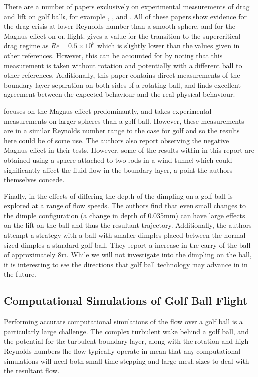 There are a number of papers exclusively on experimental measurements of drag and lift on golf balls, 
for example \citet{Kharlamov2007Magnus}, \citet{Naruo2014}, \citet{Kray2012} and \citet{Aoki2010}.
All of these papers show evidence for the drag crisis at lower Reynolds number than a smooth sphere,
and for the Magnus effect on on flight. \citet{Aoki2010} gives a value for the transition to the
supercritical drag regime as $Re = 0.5\times10^5$ which is slightly lower than the values given in
other references. However, this can be accounted for by noting that this measurement is taken without
rotation and potentially with a different ball to other references. Additionally, this paper contains
direct measurements of the boundary layer separation on both sides of a rotating ball, and finds 
excellent agreement between the expected behaviour and the real physical behaviour.

\citet{Kray2012} focuses on the Magnus effect predominantly, and takes experimental measurements on
larger spheres than a golf ball. However, these measurements are in a similar Reynolds number range
to the case for golf and so the results here could be of some use. The authors also report observing
the negative Magnus effect in their tests. However, some of the results within in this report are
obtained using a sphere attached to two rods in a wind tunnel which could significantly affect the fluid flow
in the boundary layer, a point the authors themselves concede.

Finally, in \citet{Naruo2014} the effects of differing the depth of the dimpling on a golf ball is 
explored at a range of flow speeds. The authors find that even small changes to the dimple configuration 
(a change in depth of 0.035mm)
can have large effects on the lift on the ball and thus the resultant trajectory. Additionally, the
authors attempt a strategy with a ball with smaller dimples placed between the normal sized dimples
a standard golf ball. They report a increase in the carry of the ball of approximately 8m. While we will not 
investigate into the dimpling on the ball, it is interesting to see the directions that golf ball
technology may advance in in the future.

\subsection{Computational Simulations of Golf Ball Flight}

Performing accurate computational simulations of the flow over a golf ball is a particularly large 
challenge. The complex turbulent wake behind a golf ball, and the potential for the turbulent boundary
layer, along with the rotation and high Reynolds numbers the flow typically operate in mean that any
computational simulations will need both small time stepping and large mesh sizes to deal with the 
resultant flow.

